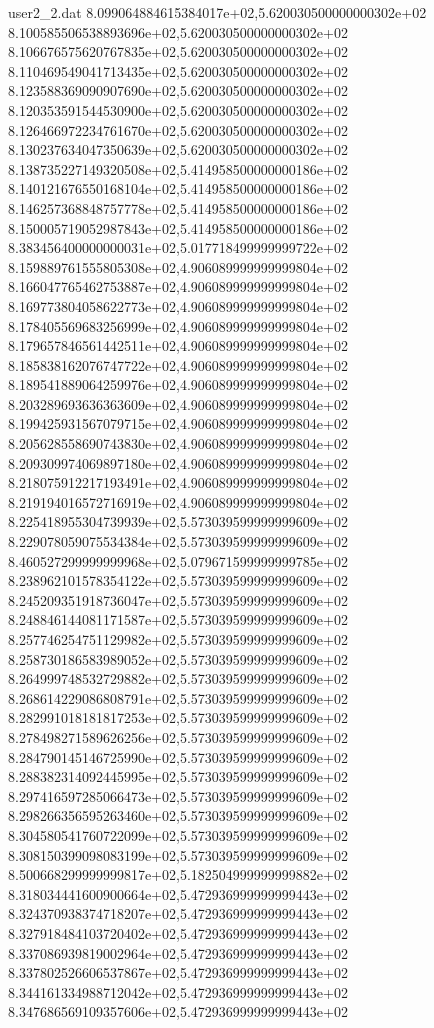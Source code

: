 \begin{filecontents}{user2_2.dat}
8.099064884615384017e+02,5.620030500000000302e+02
8.100585506538893696e+02,5.620030500000000302e+02
8.106676575620767835e+02,5.620030500000000302e+02
8.110469549041713435e+02,5.620030500000000302e+02
8.123588369090907690e+02,5.620030500000000302e+02
8.120353591544530900e+02,5.620030500000000302e+02
8.126466972234761670e+02,5.620030500000000302e+02
8.130237634047350639e+02,5.620030500000000302e+02
8.138735227149320508e+02,5.414958500000000186e+02
8.140121676550168104e+02,5.414958500000000186e+02
8.146257368848757778e+02,5.414958500000000186e+02
8.150005719052987843e+02,5.414958500000000186e+02
8.383456400000000031e+02,5.017718499999999722e+02
8.159889761555805308e+02,4.906089999999999804e+02
8.166047765462753887e+02,4.906089999999999804e+02
8.169773804058622773e+02,4.906089999999999804e+02
8.178405569683256999e+02,4.906089999999999804e+02
8.179657846561442511e+02,4.906089999999999804e+02
8.185838162076747722e+02,4.906089999999999804e+02
8.189541889064259976e+02,4.906089999999999804e+02
8.203289693636363609e+02,4.906089999999999804e+02
8.199425931567079715e+02,4.906089999999999804e+02
8.205628558690743830e+02,4.906089999999999804e+02
8.209309974069897180e+02,4.906089999999999804e+02
8.218075912217193491e+02,4.906089999999999804e+02
8.219194016572716919e+02,4.906089999999999804e+02
8.225418955304739939e+02,5.573039599999999609e+02
8.229078059075534384e+02,5.573039599999999609e+02
8.460527299999999968e+02,5.079671599999999785e+02
8.238962101578354122e+02,5.573039599999999609e+02
8.245209351918736047e+02,5.573039599999999609e+02
8.248846144081171587e+02,5.573039599999999609e+02
8.257746254751129982e+02,5.573039599999999609e+02
8.258730186583989052e+02,5.573039599999999609e+02
8.264999748532729882e+02,5.573039599999999609e+02
8.268614229086808791e+02,5.573039599999999609e+02
8.282991018181817253e+02,5.573039599999999609e+02
8.278498271589626256e+02,5.573039599999999609e+02
8.284790145146725990e+02,5.573039599999999609e+02
8.288382314092445995e+02,5.573039599999999609e+02
8.297416597285066473e+02,5.573039599999999609e+02
8.298266356595263460e+02,5.573039599999999609e+02
8.304580541760722099e+02,5.573039599999999609e+02
8.308150399098083199e+02,5.573039599999999609e+02
8.500668299999999817e+02,5.182504999999999882e+02
8.318034441600900664e+02,5.472936999999999443e+02
8.324370938374718207e+02,5.472936999999999443e+02
8.327918484103720402e+02,5.472936999999999443e+02
8.337086939819002964e+02,5.472936999999999443e+02
8.337802526606537867e+02,5.472936999999999443e+02
8.344161334988712042e+02,5.472936999999999443e+02
8.347686569109357606e+02,5.472936999999999443e+02

\end{filecontents}
